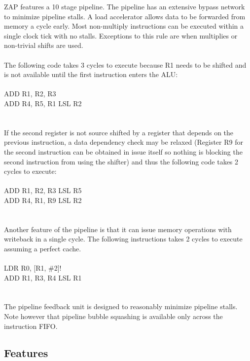 \documentclass[10pt]{article}
\begin{document}
ZAP features a 10 stage pipeline. The pipeline has an extensive bypass network 
to minimize pipeline stalls. A load accelerator allows data to be forwarded 
from memory a cycle early. Most non-multiply instructions can be executed 
within a single clock tick with no stalls. Exceptions to this rule are when 
multiplies or non-trivial shifts are used.
\\
\\
The following code takes 3 cycles to execute because R1 needs to be shifted 
and is not available until the first instruction enters the ALU: 
\\
\\
ADD R1, R2, R3 \\
ADD R4, R5, R1 LSL R2 \\
\\
\\
If the second register is not source shifted by a register that depends on the 
previous instruction, a data dependency check may be relaxed (Register R9 for 
the second instruction can be obtained in issue itself so nothing is blocking 
the second instruction from using the shifter) and thus the following code 
takes 2 cycles to execute:
\\
\\
ADD R1, R2, R3 LSL R5 \\
ADD R4, R1, R9 LSL R2 \\
\\
\\
Another feature of the pipeline is that it can issue memory operations with 
writeback in a single cycle. The following instructions takes 2 cycles to 
execute assuming a perfect cache.
\\ 
\\
LDR R0, [R1, \#2]! \\
ADD R1, R3, R4 LSL R1 \\
\\
\\
The pipeline feedback unit is designed to reasonably minimize pipeline stalls. 
Note however that pipeline bubble squashing is available only  across the 
instruction FIFO.

\subsection{Features}
\end{document}
